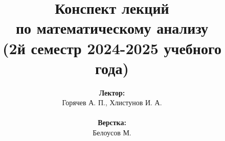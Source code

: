 \documentclass[../main.tex]{subfiles}
\begin{document}
\title{
    \bfseries
    {\Huge Конспект лекций\\ по математическому анализу}\\
    {\large (2й семестр 2024-2025 учебного года)}
}
\author{
    \textbf{Лектор:}\\ Горячев А. П., Хлистунов И. А. 
    \\ ~ \\ 
    \textbf{Верстка:}\\ Белоусов М.
}

\date{}
\maketitle
\setcounter{page}{2}
\end{document}

